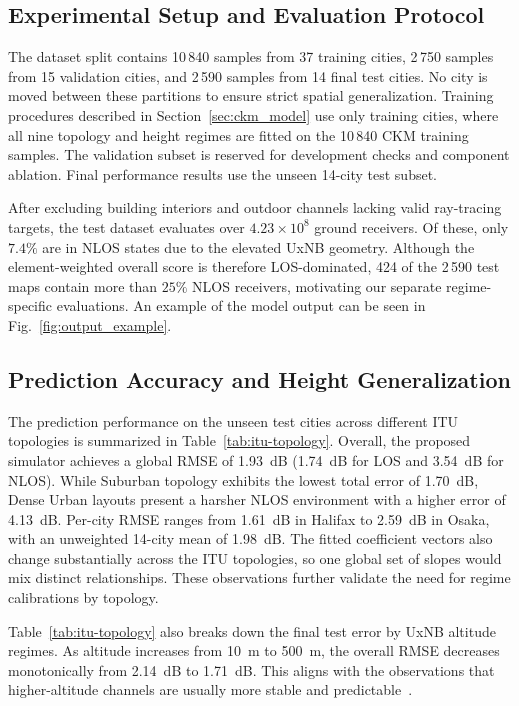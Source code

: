 \documentclass[10pt,conference,letterpaper]{IEEEtran}
\begin{document}
\subsection{Experimental Setup and Evaluation Protocol}
The dataset split contains 10\,840 samples from 37 training cities, 2\,750 samples from 15 validation cities, and 2\,590 samples from 14 final test cities. No city is moved between these partitions to ensure strict spatial generalization. Training procedures described in Section~\ref{sec:ckm_model} use only training cities, where all nine topology and height regimes are fitted on the 10\,840 CKM training samples. The validation subset is reserved for development checks and component ablation. Final performance results use the unseen 14-city test subset.

After excluding building interiors and outdoor channels lacking valid ray-tracing targets, the test dataset evaluates over $4.23 \times 10^8$ ground receivers. Of these, only $7.4\%$ are in NLOS states due to the elevated UxNB geometry. Although the element-weighted overall score is therefore LOS-dominated, 424 of the 2\,590 test maps contain more than $25\%$ NLOS receivers, motivating our separate regime-specific evaluations. An example of the model output can be seen in Fig.~\ref{fig:output_example}.

\subsection{Prediction Accuracy and Height Generalization}
The prediction performance on the unseen test cities across different ITU topologies is summarized in Table~\ref{tab:itu-topology}. Overall, the proposed simulator achieves a global RMSE of \SI{1.93}{dB} (\SI{1.74}{dB} for LOS and \SI{3.54}{dB} for NLOS). While Suburban topology exhibits the lowest total error of \SI{1.70}{dB}, Dense Urban layouts present a harsher NLOS environment with a higher error of \SI{4.13}{dB}. Per-city RMSE ranges from \SI{1.61}{dB} in Halifax to \SI{2.59}{dB} in Osaka, with an unweighted 14-city mean of \SI{1.98}{dB}. The fitted coefficient vectors also change substantially across the ITU topologies, so one global set of slopes would mix distinct relationships. These observations further validate the need for regime calibrations by topology.


Table~\ref{tab:itu-topology} also breaks down the final test error by UxNB altitude regimes. As altitude increases from \SI{10}{m} to \SI{500}{m}, the overall RMSE decreases monotonically from \SI{2.14}{dB} to \SI{1.71}{dB}. This aligns with the observations that higher-altitude channels are usually more stable and predictable~\cite{Vinogradov2018,khawaja2019survey}.
\end{document}
